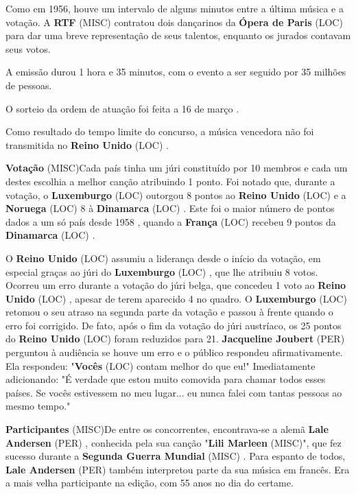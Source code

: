 \documentclass[12pt,a4paper]{article}
\begin{document}
Como em 1956, houve um intervalo de alguns minutos entre a última música e a votação. A \textbf{RTF} (MISC) contratou dois dançarinos da \textbf{Ópera de Paris} (LOC) para dar uma breve representação de seus talentos, enquanto os jurados contavam seus votos.

A emissão durou 1 hora e 35 minutos, com o evento a ser seguido por 35 milhões de pessoas.

O sorteio da ordem de atuação foi feita a 16 de março .

Como resultado do tempo limite do concurso, a música vencedora não foi transmitida no \textbf{Reino Unido} (LOC) .



\textbf{Votação} (MISC)Cada país tinha um júri constituído por 10 membros e cada um destes escolhia a melhor canção atribuindo 1 ponto. Foi notado que, durante a votação, o \textbf{Luxemburgo} (LOC) outorgou 8 pontos ao \textbf{Reino Unido} (LOC) e a \textbf{Noruega} (LOC) 8 à \textbf{Dinamarca} (LOC) . Este foi o maior número de pontos dados a um só país desde 1958 , quando a \textbf{França} (LOC) recebeu 9 pontos da \textbf{Dinamarca} (LOC) .

O \textbf{Reino Unido} (LOC) assumiu a liderança desde o início da votação, em especial graças ao júri do \textbf{Luxemburgo} (LOC) , que lhe atribuiu 8 votos. Ocorreu um erro durante a votação do júri belga, que concedeu 1 voto ao \textbf{Reino Unido} (LOC) , apesar de terem aparecido 4 no quadro. O \textbf{Luxemburgo} (LOC) retomou o seu atraso na segunda parte da votação e passou à frente quando o erro foi corrigido. De fato, após o fim da votação do júri austríaco, os 25 pontos do \textbf{Reino Unido} (LOC) foram reduzidos para 21. \textbf{Jacqueline Joubert} (PER) perguntou à audiência se houve um erro e o público respondeu afirmativamente. Ela respondeu: "\textbf{Vocês} (LOC) contam melhor do que eu!" Imediatamente adicionando: "É verdade que estou muito comovida para chamar todos esses países. Se vocês estivessem no meu lugar... eu nunca falei com tantas pessoas ao mesmo tempo."



\textbf{Participantes} (MISC)De entre os concorrentes, encontrava-se a alemã \textbf{Lale Andersen} (PER) , conhecida pela sua canção "\textbf{Lili Marleen} (MISC)", que fez sucesso durante a \textbf{Segunda Guerra Mundial} (MISC) . Para espanto de todos, \textbf{Lale Andersen} (PER) também interpretou parte da sua música em francês. Era a mais velha participante na edição, com 55 anos no dia do certame.
\end{document}
